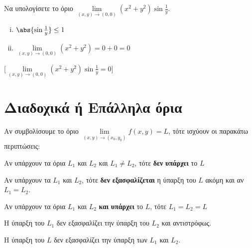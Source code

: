 \begin{example}
  Να υπολογίσετε το όριο $ \lim\limits_{(x,y)\to (0, 0)} (x^{2}+y^{2}) 
  \sin{\frac{1}{y}} $.  

  \begin{solution}
  \item {}
    \begin{minipage}{0.35\textwidth}
      \begin{enumerate}[i)]
        \item $ \abs{\sin{\frac{1}{y}}} \leq 1 $ \hfill {}
        \item $ \lim\limits_{(x,y)\to (0, 0)} (x^{2}+y^{2}) = 0+0=0 $ 
          \hfill {}
      \end{enumerate}
    \end{minipage}
    [$ \lim\limits_{(x,y)\to (0, 0)} (x^{2}+y^{2}) \sin{\frac{1}{y}} 
    = 0$]
  \end{solution}
\end{example}


\section{Διαδοχικά ή Επάλληλα όρια}


\begin{rem}
  Αν συμβολίσουμε το όριο $ \lim\limits_{(x,y)\to (x_{0}, y_{0})} f(x,y) = L $,
  τότε ισχύουν οι παρακάτω περιπτώσεις:
  \begin{myitemize}
    \item Αν υπάρχουν τα όρια $ L_{1} $ και $ L_{2} $ και $ L_{1} \neq L_{2} $, τότε
      \textbf{δεν} \textbf{υπάρχει} το $ L $
    \item Αν υπάρχουν τα $ L_{1} $ και $ L_{2} $, τότε 
      \textbf{δεν} \textbf{εξασφαλίζεται} η ύπαρξη του $ L $ ακόμη και αν 
      $ L_{1}=L_{2} $.
    \item Αν υπάρχουν τα όρια $ L_{1} $ και $ L_{2} $ \textbf{και} \textbf{υπάρχει} το 
      $ L $, τότε $ L_{1}=L_{2}=L $
    \item Η ύπαρξη του $ L_{1} $ δεν εξασφαλίζει την ύπαρξη του $ L_{2} $ 
      και αντιστρόφως.
    \item Η ύπαρξη του $ L $ δεν εξασφαλίζει την ύπαρξη των $ L_{1} $ και $ L_{2} $.
  \end{myitemize}
\end{rem}

